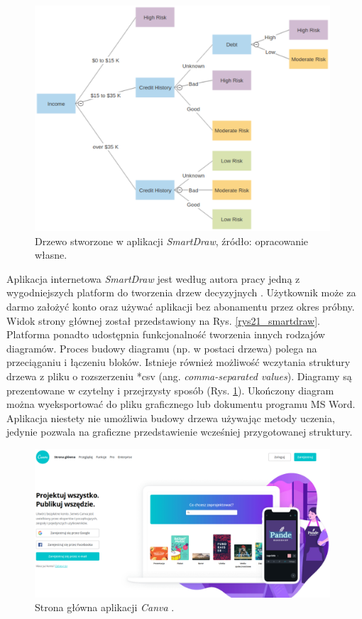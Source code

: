 \begin{figure}[htb]
	\centering
	\includegraphics[width=11cm]{grafika/smartdraw_tree.eps}
	\caption{Drzewo stworzone w aplikacji \textit{SmartDraw}, źródło: opracowanie własne.}
	\label{rys22_smartdraw_tree}
\end{figure}


Aplikacja internetowa \textit{SmartDraw} jest według autora pracy jedną z wygodniejszych platform do tworzenia drzew decyzyjnych \cite{misc_smartdraw}. Użytkownik może za darmo założyć konto oraz używać aplikacji bez abonamentu przez okres próbny. Widok strony głównej został przedstawiony na Rys. \ref{rys21_smartdraw}. Platforma ponadto udostępnia funkcjonalność tworzenia innych rodzajów diagramów. Proces budowy diagramu (np. w postaci drzewa) polega na przeciąganiu i łączeniu bloków. Istnieje również możliwość wczytania struktury drzewa z pliku o rozszerzeniu *csv (ang. \textit{comma-separated values}). Diagramy są prezentowane w czytelny i przejrzysty sposób (Rys. \ref{rys22_smartdraw_tree}). Ukończony diagram można wyeksportować do pliku graficznego lub dokumentu programu MS Word. Aplikacja niestety nie umożliwia budowy drzewa używając metody uczenia, jedynie pozwala na graficzne przedstawienie wcześniej przygotowanej struktury.

\begin{figure}[htb]
	\centering
	\includegraphics[width=11cm]{grafika/canva.eps}
	\caption{Strona główna aplikacji \textit{Canva} \cite{misc_canva}.}
	\label{rys23_canva}
\end{figure}

